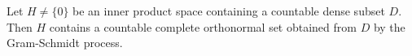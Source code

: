 Let $H \neq \{0\}$ be an inner product space containing a countable dense subset $D$. Then $H$ contains a countable complete orthonormal set obtained from $D$ by the Gram-Schmidt process.
